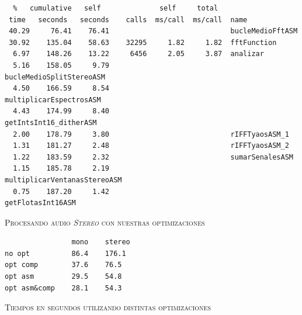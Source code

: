 \documentclass[%
    compressed,
    titlepage,
    narroweqnarray,
    inline,
    twoside,
    ]{ieee}
\begin{document}
{\small
\begin{lstlisting}
  %   cumulative   self              self     total
 time   seconds   seconds    calls  ms/call  ms/call  name
 40.29     76.41    76.41                             bucleMedioFftASM
 30.92    135.04    58.63    32295     1.82     1.82  fftFunction
  6.97    148.26    13.22     6456     2.05     3.87  analizar
  5.16    158.05     9.79                             bucleMedioSplitStereoASM
  4.50    166.59     8.54                             multiplicarEspectrosASM
  4.43    174.99     8.40                             getIntsInt16_ditherASM
  2.00    178.79     3.80                             rIFFTyaosASM_1
  1.31    181.27     2.48                             rIFFTyaosASM_2
  1.22    183.59     2.32                             sumarSenalesASM
  1.15    185.78     2.19                             multiplicarVentanasStereoASM
  0.75    187.20     1.42                             getFlotasInt16ASM
\end{lstlisting}
}
\begin{center} \textsc{Procesando audio \textit{Stereo} con nuestras optimizaciones} \end{center}

{\small
\begin{lstlisting}
                mono    stereo
no opt          86.4    176.1
opt comp        37.6    76.5
opt asm         29.5    54.8
opt asm&comp    28.1    54.3
\end{lstlisting}
}
\begin{center} \textsc{Tiempos en segundos utilizando distintas optimizaciones} \end{center}
\end{document}
